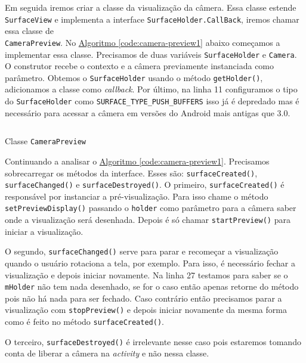 \documentclass[a4paper,12pt,brazil,oneside]{book}
\begin{document}
		Em seguida iremos criar a classe da visualização da câmera. Essa classe estende \texttt{SurfaceView} e implementa a interface \texttt{SurfaceHolder.CallBack}, iremos chamar essa classe de \\ \texttt{CameraPreview}. No \hyperref[code:camera-preview1]{Algoritmo \ref*{code:camera-preview1}} abaixo começamos a implementar essa classe. Precisamos de duas variáveis \texttt{SurfaceHolder} e \texttt{Camera}. O construtor recebe o contexto e a câmera previamente instanciada como parâmetro. Obtemos o \texttt{SurfaceHolder} usando o método \texttt{getHolder()}, adicionamos a classe como \emph{callback}. Por último, na linha 11 configuramos o tipo do \texttt{SurfaceHolder} como \texttt{SURFACE\_TYPE\_PUSH\_BUFFERS} isso já é depredado mas é necessário para acessar a câmera em versões do Android mais antigas que 3.0.

		\begin{listing}[H]
		\inputminted[linenos=true,fontsize=\small,frame=lines, framesep=2mm, tabsize=2,numbersep=5pt]{java}{src/api/camera/camerapreview1.java}
		\caption{Classe \texttt{CameraPreview}}
		\label{code:camera-preview1}
		\end{listing} 	

		Continuando a analisar o \hyperref[code:camera-preview1]{Algoritmo \ref*{code:camera-preview1}}. Precisamos sobrecarregar os métodos da interface. Esses são: \texttt{surfaceCreated()}, \texttt{surfaceChanged()} e \texttt{surfaceDestroyed()}. O primeiro, \texttt{surfaceCreated()} é responsável por instanciar a pré-visualização. Para isso chame o método \texttt{setPreviewDisplay()} passando o \texttt{holder} como parâmetro para a câmera saber onde a visualização será desenhada. Depois é só chamar \texttt{startPreview()} para iniciar a visualização. 

	O segundo, \texttt{surfaceChanged()} serve para parar e recomeçar a visualização quando o usuário rotaciona a tela, por exemplo. Para isso, é necessário fechar a visualização e depois iniciar novamente. Na linha 27 testamos para saber se o \texttt{mHolder} não tem nada desenhado, se for o caso então apenas retorne do método pois não há nada para ser fechado. Caso contrário então precisamos parar a visualização com \texttt{stopPreview()} e depois iniciar novamente da mesma forma como é feito no método \texttt{surfaceCreated()}.

	O terceiro, \texttt{surfaceDestroyed()} é irrelevante nesse caso pois estaremos tomando conta de liberar a câmera na \emph{activity} e não nessa classe.
\end{document}
